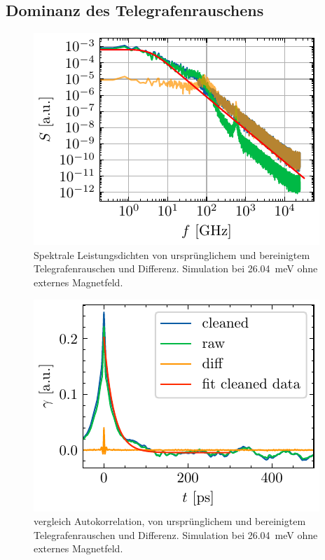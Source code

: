 \documentclass[main.tex]{subfiles}
\begin{document}


\subsection*{Dominanz des Telegrafenrauschens}

\begin{figure}[H]
    \centering
    \includegraphics{bilder/plots/Bz_0mT/spectral_power_densities_26.03meV.pdf}
    \caption{Spektrale Leistungsdichten von ursprünglichem und bereinigtem Telegrafenrauschen und Differenz. Simulation bei \SI{26.04}{\milli\electronvolt} ohne externes Magnetfeld.}\label{fig:spds}
\end{figure}

\begin{figure}[H]
    \centering
    \includegraphics{bilder/plots/Bz_0mT/autocorr_26.03meV.pdf}
    \caption{vergleich Autokorrelation, von ursprünglichem und bereinigtem Telegrafenrauschen und Differenz. Simulation bei \SI{26.04}{\milli\electronvolt} ohne externes Magnetfeld.}\label{fig:autocorr}
\end{figure}
\end{document}
